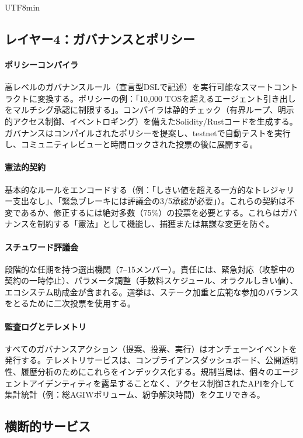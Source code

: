 \documentclass[11pt]{article}
\begin{document}
\begin{CJK}{UTF8}{min}
\subsection{レイヤー4：ガバナンスとポリシー}
\paragraph{ポリシーコンパイラ} 高レベルのガバナンスルール（宣言型DSLで記述）を実行可能なスマートコントラクトに変換する。ポリシーの例：「10,000 TOSを超えるエージェント引き出しをマルチシグ承認に制限する」。コンパイラは静的チェック（有界ループ、明示的アクセス制御、イベントロギング）を備えたSolidity/Rustコードを生成する。ガバナンスはコンパイルされたポリシーを提案し、testnetで自動テストを実行し、コミュニティレビューと時間ロックされた投票の後に展開する。

\paragraph{憲法的契約} 基本的なルールをエンコードする（例：「しきい値を超える一方的なトレジャリー支出なし」、「緊急ブレーキには評議会の3/5承認が必要」）。これらの契約は不変であるか、修正するには絶対多数（75\%）の投票を必要とする。これらはガバナンスを制約する「憲法」として機能し、捕獲または無謀な変更を防ぐ。

\paragraph{スチュワード評議会} 段階的な任期を持つ選出機関（7--15メンバー）。責任には、緊急対応（攻撃中の契約の一時停止）、パラメータ調整（手数料スケジュール、オラクルしきい値）、エコシステム助成金が含まれる。選挙は、ステーク加重と広範な参加のバランスをとるために二次投票を使用する。

\paragraph{監査ログとテレメトリ} すべてのガバナンスアクション（提案、投票、実行）はオンチェーンイベントを発行する。テレメトリサービスは、コンプライアンスダッシュボード、公開透明性、履歴分析のためにこれらをインデックス化する。規制当局は、個々のエージェントアイデンティティを露呈することなく、アクセス制御されたAPIを介して集計統計（例：総AGIWボリューム、紛争解決時間）をクエリできる。

\subsection{横断的サービス}

\end{CJK}
\end{document}
